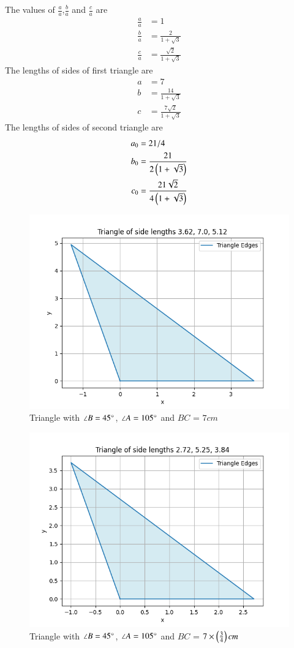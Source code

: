 \documentclass[journal]{IEEEtran}
\begin{document}
The values of $\frac{a}{a}$,$\frac{b}{a}$ and $\frac{c}{a}$ are
\begin{align}
\frac{a}{a}&=1\\
\frac{b}{a}&=\frac{2}{1+\sqrt{3}}\\
\frac{c}{a}&=\frac{\sqrt{2}}{1+\sqrt{3}}
\end{align}
The lengths of sides of first triangle are
\begin{align}
a&=7\\
b&=\frac{14}{1+\sqrt{3}}\\
c&=\frac{7\sqrt{2}}{1+\sqrt{3}}
\end{align}
The lengths of sides of second triangle are
\begin{align}
a_0&=21/4\\
b_0&=\frac{21}{2\left(1+\sqrt{3}\right)}\\
c_0&=\frac{21\sqrt{2}}{4\left(1+\sqrt{3}\right)}
\end{align}
\begin{figure}[h!]
   \centering
   \includegraphics[width=0.7\linewidth]{figs/fig1.png}
   \caption{Triangle with $\angle B=45\degree$, $\angle A=105\degree$ and $BC$ = $7cm$}
\end{figure}
\begin{figure}[h!]
   \centering
   \includegraphics[width=0.7\linewidth]{figs/fig2.png}
   \caption{Triangle with $\angle B=45\degree$, $\angle A=105\degree$ and $BC$ = $7\times\left(\frac{3}{4}\right)cm$}
\end{figure}
\end{document}
